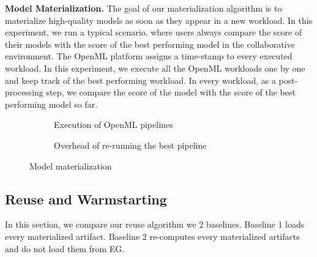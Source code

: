 \textbf{Model Materialization. }
The goal of our materialization algorithm is to materialize high-quality models as soon as they appear in a new workload.
In this experiment, we run a typical scenario, where users always compare the score of their models with the score of the best performing model in the collaborative environment.
The OpenML platform assigns a time-stamp to every executed workload.
In this experiment, we execute all the OpenML workloads one by one and keep track of the best performing workload.
In every workload, as a post-processing step, we compare the score of the model with the score of the best performing model so far.


\begin{figure}
\begin{subfigure}[b]{\linewidth}
\centering
 \resizebox{\columnwidth}{!}{%
%
}
\caption{Execution of OpenML pipelines}
\end{subfigure}
\begin{subfigure}[b]{\linewidth}
\centering
 \resizebox{\columnwidth}{!}{%
%
}

\caption{Overhead of re-running the best pipeline}
\end{subfigure}
\caption{Model materialization}
\label{exp-model-materialization}
\end{figure}

\subsection{Reuse and Warmstarting}
In this section, we compare our reuse algorithm we 2 baselines.
Baseline 1 loads every materialized artifact.
Baseline 2 re-computes every materialized artifacts and do not load them from EG.

